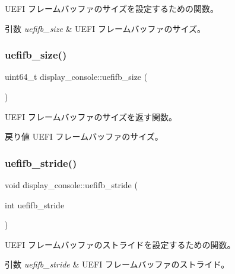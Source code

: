 U\+E\+FI フレームバッファのサイズを設定するための関数。 
\begin{DoxyParams}{引数}
{\em uefifb\+\_\+size} & U\+E\+FI フレームバッファのサイズ。 \\
\hline
\end{DoxyParams}
\hypertarget{classdisplay__console_a1163663484e3dc414a3f0891137fc590}{}\label{classdisplay__console_a1163663484e3dc414a3f0891137fc590} 
\subsubsection{\texorpdfstring{uefifb\+\_\+size()}{uefifb\_size()}\hspace{0.1cm}{\footnotesize\ttfamily [2/2]}}
{\footnotesize\ttfamily uint64\+\_\+t display\+\_\+console\+::uefifb\+\_\+size (\begin{DoxyParamCaption}{ }\end{DoxyParamCaption})}

U\+E\+FI フレームバッファのサイズを返す関数。 \begin{DoxyReturn}{戻り値}
U\+E\+FI フレームバッファのサイズ。 
\end{DoxyReturn}
\hypertarget{classdisplay__console_ab2c385da00eaa8481fc5f0ea1160783b}{}\label{classdisplay__console_ab2c385da00eaa8481fc5f0ea1160783b} 
\subsubsection{\texorpdfstring{uefifb\+\_\+stride()}{uefifb\_stride()}\hspace{0.1cm}{\footnotesize\ttfamily [1/2]}}
{\footnotesize\ttfamily void display\+\_\+console\+::uefifb\+\_\+stride (\begin{DoxyParamCaption}\item[{int}]{uefifb\+\_\+stride }\end{DoxyParamCaption})}

U\+E\+FI フレームバッファのストライドを設定するための関数。 
\begin{DoxyParams}{引数}
{\em uefifb\+\_\+stride} & U\+E\+FI フレームバッファのストライド。 \\
\hline
\end{DoxyParams}
\hypertarget{classdisplay__console_aacd72b116774e3d9cb02a364cda9b1b9}{}\label{classdisplay__console_aacd72b116774e3d9cb02a364cda9b1b9} 
